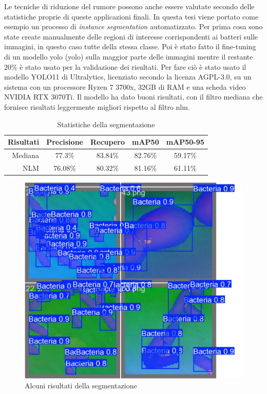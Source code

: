 \documentclass[../main.tex]{subfiles}
\begin{document}
Le tecniche di riduzione del rumore possono anche essere valutate secondo delle statistiche proprie di queste applicazioni finali. In questa tesi viene portato come esempio un processo di \textit{instance segmentation} automatizzato\cite{hafiz_2020}. Per prima cosa sono state create manualmente delle regioni di interesse corrispondenti ai batteri sulle immagini, in questo caso tutte della stessa classe. Poi è stato fatto il fine-tuning di un modello \acrshort{yolo} (\acrlong{yolo}) sulla maggior parte delle immagini mentre il restante $20\%$ è stato usato per la validazione dei risultati. Per fare ciò è stato usato il modello YOLO11 di Ultralytics\cite{ultralytics_2023}, licenziato secondo la licenza AGPL-3.0, su un sistema con un processore Ryzen 7 3700x, 32GB di RAM e una scheda video NVIDIA RTX 3070Ti. Il modello ha dato buoni risultati, con il filtro mediana che fornisce risultati leggermente migliori rispetto al filtro \acrshort{nlm}.\medskip

\begin{table}[ht]
	\centering
	\begin{tabular}{r|cccc}
	\textbf{Risultati} & \textbf{Precisione} & \textbf{Recupero} & \textbf{mAP50} & \textbf{mAP50-95} \\
	\hline\hline
	Mediana & 77.3\% & 83.84\% & 82.76\% & 59.17\% \\
	NLM & 76.08\% & 80.32\% & 81.16\% & 61.11\%
	\end{tabular}
	\caption{Statistiche della segmentazione}
\end{table}

\begin{figure}[ht]
	\includegraphics[keepaspectratio,width=\linewidth]{images/seg_val.png}
	\caption{Alcuni risultati della segmentazione}
\end{figure}
\end{document}
